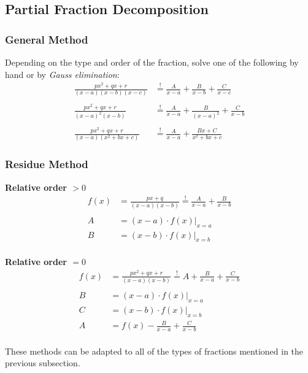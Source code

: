 \subsection*{Partial Fraction Decomposition}
\subsubsection{General Method}
Depending on the type and order of the fraction, solve one of the following by hand or by \textit{Gauss elimination}:
\begin{align*}
    \frac{px^2+qx+r}{(x-a)(x-b)(x-c)}     & \overset{!}{=} \frac{A}{x-a}+\frac{B}{x-b}+\frac{C}{x-c}       \\\\
    \frac{px^2+qx+r}{{(x-a)}^2(x-b)}      & \overset{!}{=} \frac{A}{x-a}+\frac{B}{{(x-a)}^2}+\frac{C}{x-b} \\\\
    \frac{px^{2}+qx+r}{(x-a)(x^{2}+bx+c)} & \overset{!}{=} \frac A{x-a}+\frac{Bx+C}{x^2+bx+c}
\end{align*}

\subsubsection{Residue Method}
\textbf{Relative order $>0$}
\begin{align*}
    f(x) & =\frac{px+q}{(x-a)(x-b)} \overset{!}{=} \frac{A}{x-a}+\frac{B}{x-b} \\\\
    A    & =(x-a)\cdot f(x)\Big|_{x=a}                                         \\
    B    & =(x-b)\cdot f(x)\Big|_{x=b}
\end{align*}\\
\textbf{Relative order $=0$}
\begin{align*}
    f(x) & =\frac{px^2+qx+r}{(x-a)(x-b)} \overset{!}{=} A+\frac{B}{x-a}+\frac{C}{x-b} \\\\
    B    & =(x-a)\cdot f(x)\Big|_{x=a}                                                \\
    C    & =(x-b)\cdot f(x)\Big|_{x=b}                                                \\
    A    & = f(x)-\frac{B}{x-a}+\frac{C}{x-b}
\end{align*}\\
These methods can be adapted to all of the types of fractions mentioned in the previous subsection.
